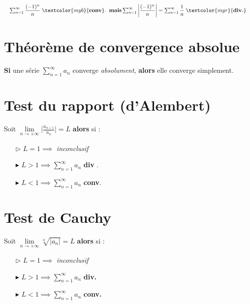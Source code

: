 \documentclass{report}
\begin{document}
\begin{multicols*}{3}
    \noindent 
    \begin{align*}
    \resizebox{1\linewidth}{!}{$
    \sum_{n=1}^{\infty }\dfrac{(-1)^n}{n} \; 
    \textcolor{myb}{\textbf{conv}}. \;\;  \textbf{mais} 
          \sum_{n=1}^{\infty }\left|\dfrac{(-1)^n}{n} \right| = 
          \sum_{n=1}^{\infty }\dfrac{1}{n} \;
          \textcolor{myr}{\textbf{div.}}  
    $}          
    \end{align*}
    \section{Théorème de convergence absolue}
    \textbf{Si} une série $\sum_{n=1}^{\infty }a_n$ converge \textit{absolument}, 
       \textbf{alors} elle converge simplement.  


    \section{Test du rapport (d'Alembert)}
    Soit $\lim\limits_{n \to+\infty } \Big|\frac{a_{n+1}}{a_n}  \Big| = L$ 
    \textbf{alors} si :   
    \begin{itemize}
    \item [$\rhd$ ] $L = 1 \implies$ \textit{ inconclusif}  
    \item [$\blacktriangleright$ ] $L > 1 \implies \sum_{n=1}^{\infty } a_n$ 
      \textcolor{myr}{\textbf{div}} .   
    \item [$\blacktriangleright$ ] $L < 1 \implies \sum_{n=1}^{\infty } a_n$ 
    \textcolor{myb}{\textbf{conv}}. 
    \end{itemize}


    \section{Test de Cauchy}
    \mbox{}\vspace{0.2em}
    Soit $\lim\limits_{n \to+\infty } \sqrt[n]{\big| a_n \big|} = L$ 
    \textbf{alors} si :   
    \begin{itemize}
    \item [$\rhd$ ] $L = 1 \implies$ \textit{inconclusif}  
    \item [$\blacktriangleright$ ] $L > 1 \implies \sum_{n=1}^{\infty }a_n$ 
        \textcolor{myr}{\textbf{div.}} 
    \item [$\blacktriangleright$ ] $L < 1 \implies \sum_{n=1}^{\infty }a_n$ 
        \textcolor{myb}{\textbf{conv.}} 
    \end{itemize}



\end{multicols*}
\end{document}
